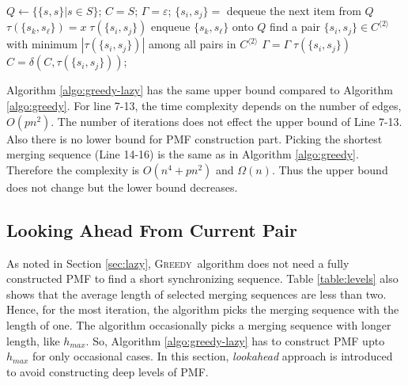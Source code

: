 \documentclass[12pt]{article}
\newcommand{\greedyAlgo}{\textsc{Greedy}}
\begin{document}
\begin{algorithm}[ht]	
	\caption{\greedyAlgo\ algorithm with lazy PMF construction}
	\label{algo:greedy-lazy}
	
	$Q \longleftarrow \{ \{ s,s \}| s \in S \}$; 
	$C = S$; 
	$\Gamma = \varepsilon$; 
	{
		{
			$\{ s_i, s_j \} = $ dequeue the next item from $Q$\;
			{
				{
					{
						$\tau(\{ s_k, s_\ell \}) = x \; \tau(\{ s_i, s_j\})$\;
						enqueue $\{ s_k,s_\ell \}$ onto $Q$\;
					}
				}
			} 		
		}
		find a pair $\{ s_i, s_j \} \in C^{\langle 2 \rangle}$ 
		with minimum $|\tau(\{ s_i,s_j \})|$ among all pairs 
		in $C^{\langle 2 \rangle}$\;
		$\Gamma = \Gamma \; \tau(\{ s_i, s_j \})$\;
		$C = \delta(C,\tau(\{ s_i,s_j\}))$;
	}
\end{algorithm}

Algorithm \ref{algo:greedy-lazy} has the same upper bound compared to Algorithm \ref{algo:greedy}. For line 7-13, the time complexity depends on the number of edges, $O(pn^2)$. The number of iterations does not effect the upper bound of Line 7-13. Also there is no lower bound for PMF construction part. Picking the shortest merging sequence (Line 14-16) is the same as in Algorithm \ref{algo:greedy}. Therefore the complexity is $O(n^4+ pn^2)$ and $\Omega(n)$. Thus the upper bound does not change but the lower bound decreases.

\subsection{Looking Ahead From Current Pair}
\label{sec:lookahead}

As noted in Section \ref{sec:lazy}, \greedyAlgo\ algorithm does not need a fully constructed PMF to find a short synchronizing sequence. Table \ref{table:levels} also shows that the average length of selected merging sequences are less than two. Hence, for the most iteration, the algorithm picks the merging sequence with the length of one. The algorithm occasionally picks a merging sequence with longer length, like $h_{max}$. So, Algorithm \ref{algo:greedy-lazy} has to construct PMF upto $h_{max}$ for only occasional cases. In this section, \textit{lookahead} approach is introduced to avoid constructing deep levels of PMF. 
\end{document}
